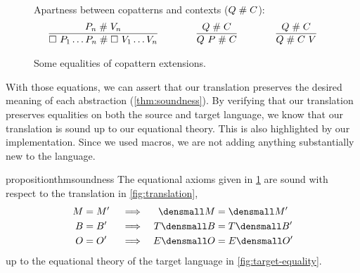 \begin{figure}[t!]
Apartness between copatterns and contexts ($Q \mathrel{\#} C$):
\begin{gather*}
  \infer
  {\hole ~ P_1 \dots P_n \apart \hole ~ V_1 \dots V_n}
  {P_n \apart V_n}
  \qqqquad
  \infer
  {Q ~ P \apart C}
  {Q \apart C}
  \qqqquad
  \infer
  {Q \apart C ~ V}
  {Q \apart C}
\end{gather*}

\caption{Some equalities of copattern extensions.}
\label{fig:source-equality}
\end{figure}


With those equations, we can assert that our translation preserves the desired meaning of each abstraction (\cref{thm:soundness}).
By verifying that our translation preserves equalities on both the source and target language, we know that our translation is sound up to our equational theory.
This is also highlighted by our implementation.
Since we used macros, we are not adding anything substantially new to the language.

\begin{restatable}[Soundness]{proposition}{thmsoundness}
  \label{thm:soundness}
  The equational axioms given in \cref{fig:source-equality} are sound with
  respect to the translation in \cref{fig:translation},
  \begin{align*}
    M &= M' &&\implies & \den{M} &= \den{M'} \\
    B &= B' &&\implies & T\den{B} &= T\den{B'} \\
    O &= O' &&\implies & E\den{O} &= E\den{O'}
  \end{align*}
  up to the equational theory of the target language in
  \cref{fig:target-equality}.
\end{restatable}


